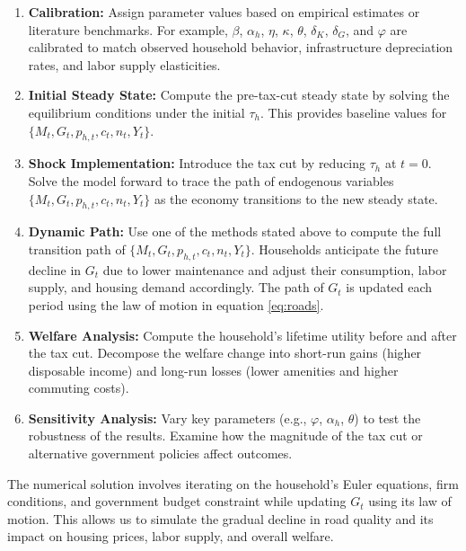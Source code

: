 \begin{enumerate}
    \item \textbf{Calibration:} Assign parameter values based on empirical estimates or literature benchmarks. For example, $\beta$, $\alpha_h$, $\eta$, $\kappa$, $\theta$, $\delta_K$, $\delta_G$, and $\varphi$ are calibrated to match observed household behavior, infrastructure depreciation rates, and labor supply elasticities.

    \item \textbf{Initial Steady State:} Compute the pre-tax-cut steady state by solving the equilibrium conditions under the initial $\tau_h$. This provides baseline values for  $\{M_t, G_t, p_{h,t}, c_t, n_t, Y_t\}$.

    \item \textbf{Shock Implementation:} Introduce the tax cut by reducing $\tau_h$ at $t=0$. Solve the model forward to trace the path of endogenous variables  $\{M_t, G_t, p_{h,t}, c_t, n_t, Y_t\}$ as the economy transitions to the new steady state.

    \item \textbf{Dynamic Path:} Use one of the methods stated above to compute the full transition path of $\{M_t, G_t, p_{h,t}, c_t, n_t, Y_t\}$. Households anticipate the future decline in $G_t$ due to lower maintenance and adjust their consumption, labor supply, and housing demand accordingly. The path of $G_t$ is updated each period using the law of motion in equation \ref{eq:roads}.

    \item \textbf{Welfare Analysis:} Compute the household’s lifetime utility before and after the tax cut. Decompose the welfare change into short-run gains (higher disposable income) and long-run losses (lower amenities and higher commuting costs).

    \item \textbf{Sensitivity Analysis:} Vary key parameters (e.g., $\varphi$, $\alpha_h$, $\theta$) to test the robustness of the results. Examine how the magnitude of the tax cut or alternative government policies affect outcomes.
\end{enumerate}

The numerical solution involves iterating on the household’s Euler equations, firm conditions, and government budget constraint while updating $G_t$ using its law of motion. This allows us to simulate the gradual decline in road quality and its impact on housing prices, labor supply, and overall welfare.

